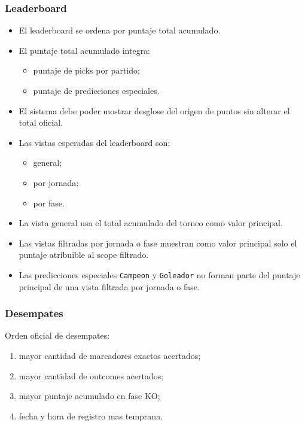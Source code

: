 \subsubsection{Leaderboard}

\begin{itemize}
  \item El leaderboard se ordena por puntaje total acumulado.
  \item El puntaje total acumulado integra:
    \begin{itemize}
      \item puntaje de picks por partido;
      \item puntaje de predicciones especiales.
    \end{itemize}
  \item El sistema debe poder mostrar desglose del origen de puntos sin alterar el total oficial.
  \item Las vistas esperadas del leaderboard son:
    \begin{itemize}
      \item general;
      \item por jornada;
      \item por fase.
    \end{itemize}
  \item La vista general usa el total acumulado del torneo como valor principal.
  \item Las vistas filtradas por jornada o fase muestran como valor principal solo el puntaje atribuible al scope filtrado.
  \item Las predicciones especiales \texttt{Campeon} y \texttt{Goleador} no forman parte del puntaje principal de una vista filtrada por jornada o fase.
\end{itemize}

\subsubsection{Desempates}

Orden oficial de desempates:

\begin{enumerate}
  \item mayor cantidad de marcadores exactos acertados;
  \item mayor cantidad de outcomes acertados;
  \item mayor puntaje acumulado en fase KO;
  \item fecha y hora de registro mas temprana.
\end{enumerate}

